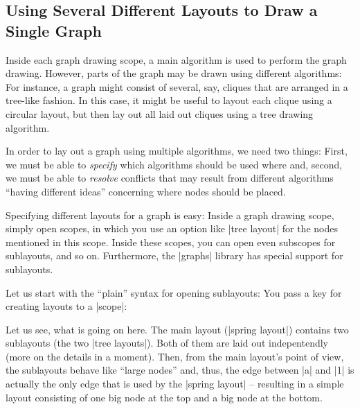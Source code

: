 

\subsection{Using Several Different Layouts to Draw a Single Graph}

\label{section-gd-sublayouts}

Inside each graph drawing scope, a main algorithm is used to perform
the graph drawing. However, parts of the graph may be drawn using
different algorithms: For instance, a graph might consist of
several, say, cliques that are arranged in a tree-like fashion. In
this case, it might be useful to layout each clique using a circular
layout, but then lay out all laid out cliques using a tree drawing
algorithm.

In order to lay out a graph using multiple algorithms, we need two
things: First, we must be able to \emph{specify} which algorithms
should be used where and, second, we must be able to \emph{resolve}
conflicts that may result from different algorithms ``having different
ideas'' concerning where nodes should be placed.

Specifying different layouts for a graph is easy: Inside a graph
drawing scope, simply open scopes, in which you use an option like
|tree layout| for the nodes mentioned in this scope. Inside these
scopes, you can open even subscopes for sublayouts, and so
on. Furthermore, the |graphs| library has special support for
sublayouts.

Let us start with the ``plain'' syntax for opening sublayouts: You
pass a key for creating layouts to a |scope|:

\begin{codeexample}[]
\end{codeexample}

Let us see, what is going on here. The main layout (|spring layout|)
contains two sublayouts (the two |tree layouts|). Both of them are
laid out indepentendly (more on the details in a moment). Then, from
the main layout's point of view, the sublayouts behave like ``large
nodes'' and, thus, the edge between |a| and |1| is actually the only
edge that is used by the |spring layout| -- resulting in a simple
layout consisting of one big node at the top and a big node at the
bottom.

